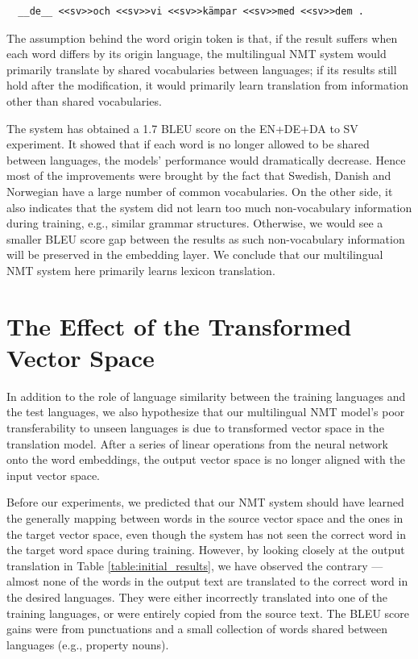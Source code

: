 \documentclass[thesis,fonts=libertine]{cluu}
\begin{document}
\begin{verbatim}
  __de__ <<sv>>och <<sv>>vi <<sv>>kämpar <<sv>>med <<sv>>dem .
\end{verbatim}

The assumption behind the word origin token is that, if the result suffers when each word differs by its origin language, the multilingual NMT system would primarily translate by shared vocabularies between languages; if its results still hold after the modification, it would primarily learn translation from information other than shared vocabularies.

The system has obtained a 1.7 BLEU score on the EN+DE+DA to SV experiment. It showed that if each word is no longer allowed to be shared between languages, the models' performance would dramatically decrease. Hence most of the improvements were brought by the fact that Swedish, Danish and Norwegian have a large number of common vocabularies. On the other side, it also indicates that the system did not learn too much non-vocabulary information during training, e.g., similar grammar structures. Otherwise, we would see a smaller BLEU score gap between the results as such non-vocabulary information will be preserved in the embedding layer. We conclude that our multilingual NMT system here primarily learns lexicon translation.

\section{The Effect of the Transformed Vector Space}

In addition to the role of language similarity between the training languages and the test languages, we also hypothesize that our multilingual NMT model's poor transferability to unseen languages is due to transformed vector space in the translation model. After a series of linear operations from the neural network onto the word embeddings, the output vector space is no longer aligned with the input vector space.

Before our experiments, we predicted that our NMT system should have learned the generally mapping between words in the source vector space and the ones in the target vector space, even though the system has not seen the correct word in the target word space during training. However, by looking closely at the output translation in Table \ref{table:initial_results}, we have observed the contrary --- almost none of the words in the output text are translated to the correct word in the desired languages. They were either incorrectly translated into one of the training languages, or were entirely copied from the source text. The BLEU score gains were from punctuations and a small collection of words shared between languages (e.g., property nouns).
\end{document}
